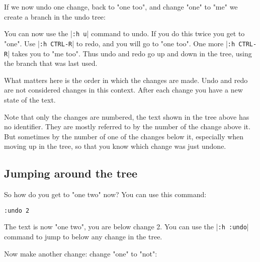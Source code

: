 If we now undo one change, back to "one too", and change "one" to "me" we create a branch in the undo tree:

\begin{center}
\end{center}

You can now use the |\verb!:h u!| command to undo.
If you do this twice you get to "one".
Use |\verb!:h CTRL-R!| to redo, and you will go to "one too".
One more |\verb!:h CTRL-R!| takes you to "me too".
Thus undo and redo go up and down in the tree, using the branch that was last used.

What matters here is the order in which the changes are made.
Undo and redo are not considered changes in this context.
After each change you have a new state of the text.

Note that only the changes are numbered, the text shown in the tree above has no identifier.
They are mostly referred to by the number of the change above it.
But sometimes by the number of one of the changes below it, especially when moving up in the tree, so that you know which change was just undone.
\subsection{Jumping around the tree}
So how do you get to "one two" now?  You can use this command:

\begin{Verbatim}[samepage=true]
 :undo 2
\end{Verbatim}

The text is now "one two", you are below change 2.
You can use the |\verb!:h :undo!| command to jump to below any change in the tree.

Now make another change: change "one" to "not":

\begin{center}
\end{center}

